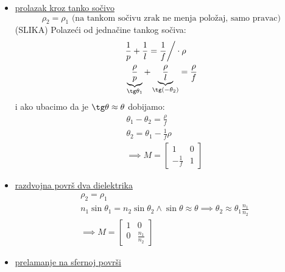 \documentclass[fleqn]{report}
\begin{document}
\begin{itemize}
    \item \underline{prolazak kroz tanko sočivo}
          \begin{equation*}
              \rho_2 = \rho_1 \text{ (na tankom sočivu zrak ne menja položaj, samo pravac)}
          \end{equation*}
          (SLIKA)
          Polazeći od jednačine tankog sočiva:
          \begin{align*}
               & \frac{1}{p} + \frac{1}{l} = \frac{1}{f} \bigg/ \cdot \rho                                                 \\
               & \underbrace{\frac{\rho}{p}}_{\tg\theta_1} + \underbrace{\frac{\rho}{l}}_{\tg(-\theta_2)} = \frac{\rho}{f} \\
          \end{align*}
          i ako ubacimo da je $\tg\theta \approx \theta$ dobijamo:
          \begin{align*}
               & \theta_1 - \theta_2 = \frac{\rho}{f}  \\
               & \theta_2 = \theta_1 - \frac{1}{f}\rho \\
               & \implies M = \begin{bmatrix}
                                  1            & 0 \\
                                  -\frac{1}{f} & 1
                              \end{bmatrix}
          \end{align*}
    \item \underline{razdvojna površ dva dielektrika}
          \begin{align*}
               & \rho_2 = \rho_1                                                                                                        \\
               & n_1 \sin\theta_1 = n_2\sin\theta_2  \land \sin\theta \approx \theta \implies \theta_2 \approx \theta_1 \frac{n_1}{n_2} \\
               & \implies M = \begin{bmatrix}
                                  1 & 0               \\
                                  0 & \frac{n_1}{n_2}
                              \end{bmatrix}
          \end{align*}
    \item \underline{prelamanje na sfernoj površi}
          \begin{equation*}

\end{equation*}
\end{itemize}
\end{document}
